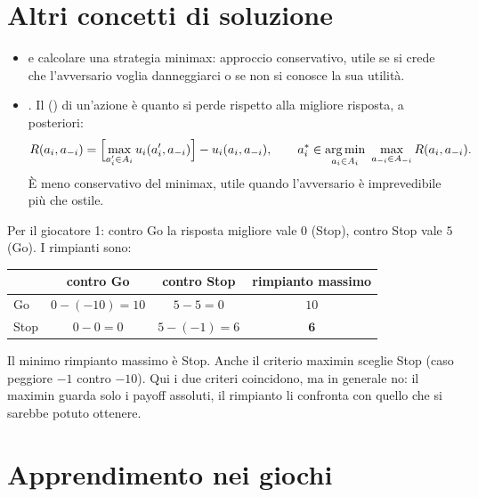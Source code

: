 \section{Altri concetti di soluzione}

\begin{itemize}
  \item {} e calcolare una strategia minimax: approccio
        conservativo, utile se si crede che l'avversario voglia danneggiarci o se non si
        conosce la sua utilità.
  \item {}. Il  () di un'azione
        è quanto si perde rispetto alla migliore risposta, a posteriori:
        \[
          R(a_i, a_{-i}) = \Bigl[\max_{a_i' \in A_i} u_i(a_i', a_{-i})\Bigr] - u_i(a_i, a_{-i}),
          \qquad
          a_i^* \in \operatorname*{arg\,min}_{a_i \in A_i}\ \max_{a_{-i} \in A_{-i}} R(a_i, a_{-i}).
        \]
        È meno conservativo del minimax, utile quando l'avversario è imprevedibile più che
        ostile.
\end{itemize}

\begin{extra}
Per il giocatore 1: contro Go la risposta migliore vale $0$ (Stop), contro Stop vale $5$
(Go). I rimpianti sono:
\begin{center}
\renewcommand{\arraystretch}{1.2}
\begin{tabular}{lccc}
\toprule
 & contro Go & contro Stop & rimpianto massimo \\
\midrule
Go   & $0 - (-10) = 10$ & $5 - 5 = 0$ & $10$ \\
Stop & $0 - 0 = 0$ & $5 - (-1) = 6$ & $\mathbf{6}$ \\
\bottomrule
\end{tabular}
\end{center}
Il minimo rimpianto massimo è Stop. Anche il criterio maximin sceglie Stop (caso peggiore
$-1$ contro $-10$). Qui i due criteri coincidono, ma in generale no: il maximin guarda solo
i payoff assoluti, il rimpianto li confronta con quello che si sarebbe potuto ottenere.
\end{extra}

\section{Apprendimento nei giochi}

